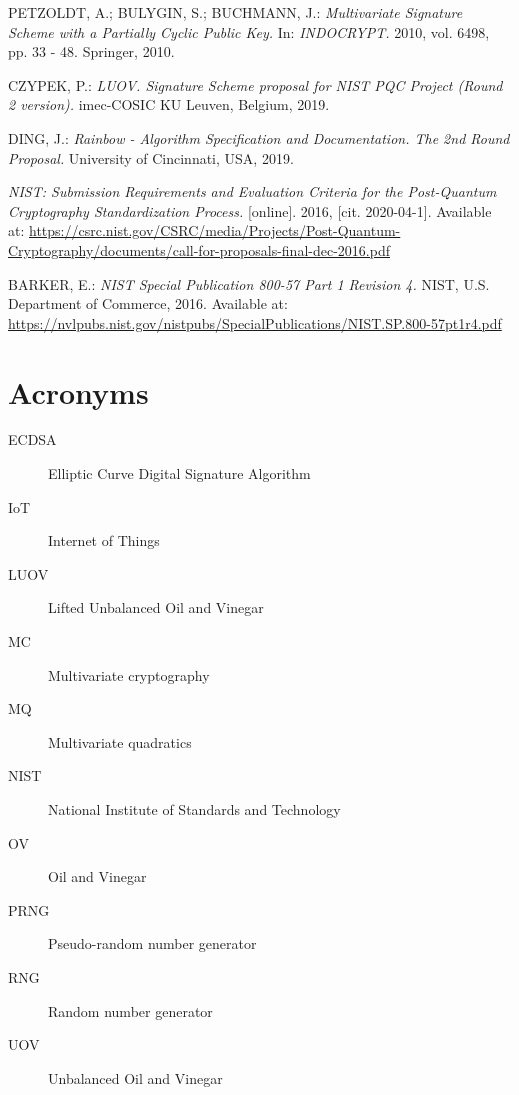 \documentclass[thesis=M,english]{FITthesis}[2019/12/23]
\begin{document}
\begin{thebibliography}{9}
PETZOLDT, A.; BULYGIN, S.; BUCHMANN, J.: \textit{Multivariate
Signature Scheme with a Partially Cyclic Public Key.} In: \textit{INDOCRYPT.} 2010, vol. 6498, pp. 33 - 48. Springer, 2010.

CZYPEK, P.: \textit{LUOV. Signature Scheme proposal for NIST PQC Project (Round 2 version).} imec-COSIC KU Leuven, Belgium, 2019.

DING, J.: \textit{Rainbow - Algorithm Specification and Documentation. The 2nd Round Proposal.} University of Cincinnati, USA, 2019.

\textit{NIST: Submission Requirements and Evaluation Criteria for the Post-Quantum Cryptography Standardization Process.} [online]. 2016, [cit. 2020-04-1]. Available at: \url{https://csrc.nist.gov/CSRC/media/Projects/Post-Quantum-Cryptography/documents/call-for-proposals-final-dec-2016.pdf}

BARKER, E.: \textit{NIST Special Publication 800-57 Part 1 Revision 4.} NIST, U.S. Department of Commerce, 2016. Available at: \url{https://nvlpubs.nist.gov/nistpubs/SpecialPublications/NIST.SP.800-57pt1r4.pdf}

\end{thebibliography}
\appendix

\chapter{Acronyms}
\begin{description}
	\item[ECDSA] Elliptic Curve Digital Signature Algorithm
	\item[IoT] Internet of Things
	\item[LUOV] Lifted Unbalanced Oil and Vinegar
	\item[MC] Multivariate cryptography
	\item[MQ] Multivariate quadratics
	\item[NIST] National Institute of Standards and Technology
	\item[OV] Oil and Vinegar
	\item[PRNG] Pseudo-random number generator
	\item[RNG] Random number generator
	\item[UOV] Unbalanced Oil and Vinegar	
\end{description}
\end{document}

